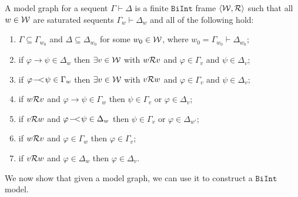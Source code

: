 \documentclass{llncs}
\numberwithin{equation}{section}
\newcommand{\pair}[2]{\langle #1, #2\rangle}
\newcommand{\Lg}[1]{\mathtt{#1}}
\newcommand{\ExImp}{\rightarrow}
\newcommand{\sequent}{\vdash}
\newcommand{\WeakImp}{
\begin{picture}(10,10)
     \put(1,0){$-$}
     \put(7,0){$<$}
   \end{picture}
   \;\; 
}
\newcommand{\mycal}[1]{
        {\cal{#1}}
}
\newcommand {\BiInt}{
        \Lg{BiInt}
}
\begin{document}
\begin{definition}\label{defModelGraph}
A model graph for a sequent $\Gamma \sequent \Delta$ is a finite $\BiInt$ frame $\pair{\mycal{W}}{\mycal{R}}$ such that all $w \in \mycal{W}$ are saturated sequents $\Gamma_w \sequent \Delta_w$ and all of the following hold:
	\begin{enumerate}
		\item $\Gamma \subseteq \Gamma_{w_0}$ and $\Delta \subseteq \Delta_{w_0}$ for some $w_0 \in \mycal{W}$, where $w_0 = \Gamma_{w_0} \sequent \Delta_{w_0}$;
		\item\label{p_impRight} if $\varphi \ExImp \psi \in \Delta_w$ then $\exists v \in \mycal{W}$ with $w \mycal{R} v$ and $\varphi \in \Gamma_{v}$ and $\psi \in \Delta_{v}$;
		\item\label{p_weakImpLeft} if $\varphi \WeakImp \psi \in \Gamma_w$ then $\exists v \in \mycal{W}$ with $v \mycal{R} w$ and $\varphi \in \Gamma_{v}$ and $\psi \in \Delta_{v}$;
		\item\label{p_impLeft} if $w \mycal{R} v$ and $\varphi \ExImp \psi \in \Gamma_w$ then $\psi \in \Gamma_{v}$ or $\varphi \in \Delta_{v}$;
		\item\label{p_weakImpRight} if $v \mycal{R} w$ and $\varphi \WeakImp \psi \in \Delta_w$ then $\psi \in \Gamma_{v}$ or $\varphi \in \Delta_{w'}$;
		\item\label{p_pers} if $w \mycal{R} v$ and $\varphi \in \Gamma_w$ then $\varphi \in \Gamma_{v}$;
		\item\label{p_revpers} if $v \mycal{R} w$ and $\varphi \in \Delta_w$ then $\varphi \in \Delta_{v}$.	
	\end{enumerate}
\end{definition}

\noindent We now show that given a model graph, we can use it to construct a $\BiInt$ model.
\end{document}
